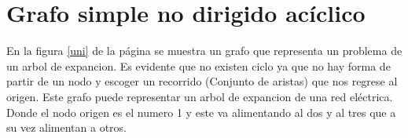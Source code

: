 \documentclass{article}
\begin{document}
 

\section{Grafo simple no dirigido acíclico}

En la figura \ref{uni} de la página \pageref{uni} se muestra un grafo que representa un problema de un arbol de expancion. Es evidente que no existen ciclo ya que no hay forma de partir de un nodo y escoger un recorrido (Conjunto de aristas) que nos regrese al origen. Este grafo puede representar un arbol de expancion de una red eléctrica. Donde el nodo origen es el numero 1 y este va alimentando al dos y al tres que a su vez alimentan a otros.

\end{document}
